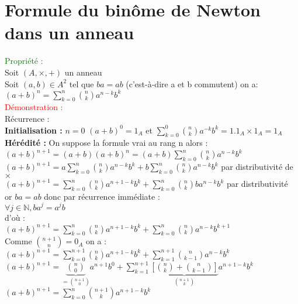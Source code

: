 \documentclass{article}
\begin{document}
\section{Formule du binôme de Newton dans un anneau}
\textcolor{green}{Propriété : } \\ 
Soit $(A, \times,+)$ un anneau \\ 
Soit $(a,b)\in A^2$ tel que $ba=ab$ (c'est-à-dire a et b commutent) on a: \\
$(a+b)^n=\sum_{k=0}^n\binom{n}{k}a^{n-k}b^k$ \\ 
\textcolor{red}{Démonstration :} \\ 
Récurrence : \\ 
{\bf Initialisation :} $n=0$ $(a+b)^0=1_A$ et $\sum_{k=0}^0\binom{n}{k}a^{-k}b^k=1.1_A\times 1_A =1_A$ \\ 
{\bf Hérédité :} On suppose la formule vrai au rang n  alors : \\ 
$(a+b)^{n+1}=(a+b)(a+b)^n=(a+b)\sum_{k=0}^n\binom{n}{k}a^{n-k}b^k$ \\ 
$(a+b)^{n+1}=a\sum_{k=0}^n\binom{n}{k}a^{n-k}b^k+ b\sum_{k=0}^n\binom{n}{k}a^{n-k}b^k$ par distributivité de $\times$ \\ 
$(a+b)^{n+1}=\sum_{k=0}^n\binom{n}{k}a^{n+1-k}b^k+\sum_{k=0}^n\binom{n}{k}ba^{n-k}b^k$ par distributivité \\ 
or $ba=ab$ donc par récurrence immédiate : \\ 
$\forall j \in \mathbb{N}, ba^j=a^jb$ \\ 
d'où : \\ 
$(a+b)^{n+1}=\sum_{k=0}^n\binom{n}{k}a^{n+1-k}b^k+\sum_{k=0}^n\binom{n}{k}a^{n-k}b^{k+1}$ \\
Comme $\binom{n+1}{n}=0_A$ on a : \\ 
$(a+b)^{n+1}=\sum_{k=0}^{n+1}\binom{n}{k}a^{n+1-k}b^k+\sum_{k=1}^{n+1}\binom{n}{k-1}a^{n-k}b^{k}$ \\ 
$(a+b)^{n+1}=\underbrace{\binom{n}{0}}_{=\binom{n+1}{0}}a^{n+1}b^0+\sum_{k=1}^{n+1}\underbrace{[\binom{n}{k}+\binom{n}{k-1}]}_{\binom{n+1}{k}}a^{n+1-k}b^k$ \\ 
$(a+b)^{n+1}=\sum^{n}_{k=0}{\binom{n+1}{k}a^{n+1-k}b^k}$
\end{document}

